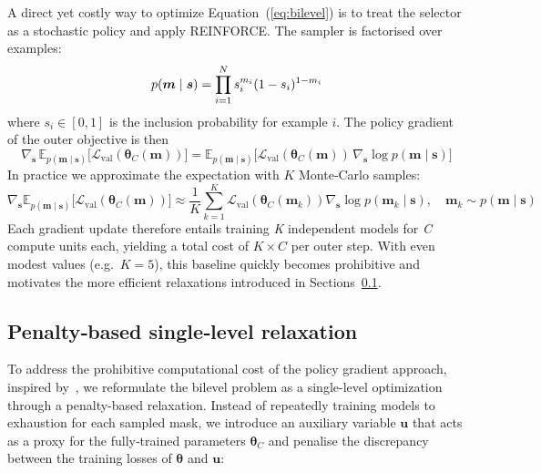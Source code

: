A direct yet costly way to optimize Equation~(\ref{eq:bilevel}) is to treat the selector as a stochastic policy and apply REINFORCE.  
The sampler is factorised over examples:
\begin{equation}
\label{eq:bernoulli}
\small
p(\bm{m}\mid \bm{s})=\prod_{i=1}^{N} s_i^{m_i}(1-s_i)^{1-m_i}
\end{equation}
where $s_i\!\in\![0,1]$ is the inclusion probability for example $i$.  
The policy gradient of the outer objective is then
\begin{equation}
\nabla_{\bm{s}}\,
\mathbb E_{p(\bm{m}\mid \bm{s})}
\!\bigl[\mathcal L_{\mathrm{val}}(\bm{\theta}_C(\bm{m}))\bigr]
= 
\mathbb E_{p(\bm{m}\mid \bm{s})}
\!\bigl[\mathcal L_{\mathrm{val}}(\bm{\theta}_C(\bm{m}))\,
\nabla_{\bm{s}}\log p(\bm{m}\mid \bm{s})
\bigr]
\end{equation} 
In practice we approximate the expectation with $K$ Monte‑Carlo samples:
\begin{equation}
\nabla_{\bm{s}} \mathbb E_{p(\bm{m}\mid \bm{s})}
\!\bigl[\mathcal L_{\mathrm{val}}(\bm{\theta}_C(\bm{m}))\bigr] \approx
\frac{1}{K}\sum_{k=1}^{K}
\mathcal L_{\mathrm{val}}(\bm{\theta}_C(\bm{m}_k))
\nabla_{\bm{s}}\log p(\bm{m}_k\mid \bm{s}),
\quad
\bm{m}_k\sim p(\bm{m}\mid \bm{s})
\end{equation}
Each gradient update therefore entails training \textit{K} independent models for \textit{C} compute units each, yielding a total cost of $K\!\times\!C$ per outer step.  
With even modest values (e.g.\ $K{=}5$), this baseline quickly becomes prohibitive and motivates the more efficient relaxations introduced in Sections~\ref{sec:penalty-based-relax}.

\subsection{Penalty‑based single‑level relaxation}  
\label{sec:penalty-based-relax}
To address the prohibitive computational cost of the policy gradient approach, inspired by~\cite{kwon2023fully,pan2024scalebio}, we reformulate the bilevel problem as a single-level optimization through a penalty-based relaxation.
Instead of repeatedly training models to exhaustion for each sampled mask, we introduce an auxiliary variable $\bm{u}$ that acts as a proxy for the fully‑trained parameters $\bm{\theta}_C$ and penalise the discrepancy between the training losses of $\bm{\theta}$ and $\bm{u}$:  

